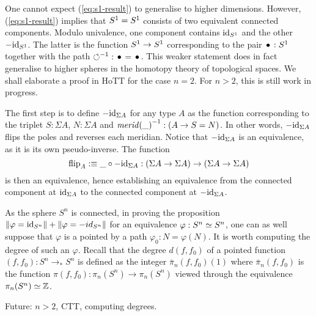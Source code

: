 \documentclass[english,a4]{article}
\newcommand{\Sn}{{S^n}}%
\newcommand{\mrd}{\mathit{merid}}%
\newcommand{\susp}[1]{\Sigma{#1}}%
\newcommand{\ptdto}{\to_\ast}%
\newcommand{\flip}{\operatorname{flip}}%
\def\blank{\_}%
\begin{document}
One cannot expect (\ref{eq:s1-result}) to generalise to higher
dimensions. However, (\ref{eq:s1-result}) implies that ${S^1} = {S^1}$
consists of two equivalent connected components. Modulo univalence,
one component contains $\mathord{\mathrm{id}}_{S^1}$ and the other $-\mathord{\mathrm{id}}_{S^1}$. The latter
is the function ${S^1} \to {S^1}$ corresponding to the pair $\base:\Sc$
together with the path $\inv\Sloop:\base=\base$. This weaker statement
does in fact generalise to higher spheres in the homotopy theory of
topological spaces. We shall elaborate a proof in HoTT for the case
$n=2$. For $n>2$, this is still work in progress.

The first step is to define $-\id_{\susp A}$ for any type $A$ as the
function corresponding to the triplet $S:\susp A$, $N:\susp A$ and
$\inv{\mrd(\blank)} : (A \to S=N)$. In other words, $-\id_{\susp A}$
flips the poles and reverses each meridian. Notice that
$-\id_{\susp A}$ is an equivalence, as it is its own
pseudo-inverse. The function
\begin{displaymath}
  \flip_A \defequi \blank \circ -\id_{\susp A} : (\susp A \to \susp A) \to (\susp A \to \susp A)
\end{displaymath}
is then an equivalence, hence establishing an equivalence from the
connected component at $\id_{\susp A}$ to the connected component at
$-\id_{\susp A}$.

As the sphere $S^n$ is connected, in proving the proposition
$\Trunc{\varphi=\id_\Sn}+\Trunc{\varphi=-id_\Sn}$ for an equivalence
$\varphi:\Sn \weq \Sn$, one can as well suppose that $\varphi$ is a
pointed by a path $\varphi_0:N=\varphi(N)$. It is worth computing the
degree of such an $\varphi$. Recall that the degree $d(f,f_0)$ of a
pointed function $(f,f_0):\Sn \ptdto\Sn$ is defined as the integer
$\bar \pi_n(f,f_0)(1)$ where $\bar\pi_n(f,f_0)$ is the function
$\pi(f,f_0) : \pi_n(\Sn) \to \pi_n(\Sn)$ viewed through the
equivalence $\pi_n(\Sn) \weq \ZZ$.

Future: $n>2$, CTT, computing degrees.




\end{document}
